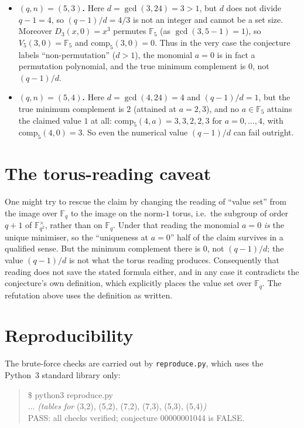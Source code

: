 \documentclass[11pt]{article}
\theoremstyle{definition}
\theoremstyle{remark}
\newcommand{\F}{\mathbb{F}}
\begin{document}
\begin{itemize}
\item \textbf{$(q,n) = (5,3)$.} Here $d = \gcd(3,24) = 3 > 1$, but $d$ does
  not divide $q-1 = 4$, so $(q-1)/d = 4/3$ is not an integer and cannot be a
  set size. Moreover $D_3(x,0) = x^3$ permutes $\F_5$ (as
  $\gcd(3, 5-1) = 1$), so $V_5(3,0) = \F_5$ and $\mathrm{comp}_5(3,0) = 0$.
  Thus in the very case the conjecture labels ``non-permutation''
  ($d>1$), the monomial $a=0$ is in fact a permutation polynomial, and the true
  minimum complement is $0$, not $(q-1)/d$.
\item \textbf{$(q,n) = (5,4)$.} Here $d = \gcd(4,24) = 4$ and
  $(q-1)/d = 1$, but the true minimum complement is $2$ (attained at $a=2,3$),
  and no $a \in \F_5$ attains the claimed value $1$ at all:
  $\mathrm{comp}_5(4,a) = 3,3,2,2,3$ for $a=0,\dots,4$, with
  $\mathrm{comp}_5(4,0) = 3$. So even the numerical value $(q-1)/d$ can fail
  outright.
\end{itemize}

\section{The torus-reading caveat}

One might try to rescue the claim by changing the reading of ``value set''
from the image over $\F_q$ to the image on the norm-$1$ torus, i.e.\ the
subgroup of order $q+1$ of $\F_{q^2}^{\times}$, rather than on $\F_q$. Under
that reading the monomial $a=0$ \emph{is} the unique minimiser, so the
``uniqueness at $a=0$'' half of the claim survives in a qualified sense. But
the minimum complement there is $0$, not $(q-1)/d$; the value $(q-1)/d$ is not
what the torus reading produces. Consequently that reading does not save the
stated formula either, and in any case it contradicts the conjecture's own
definition, which explicitly places the value set over $\F_q$. The refutation
above uses the definition as written.

\section{Reproducibility}

The brute-force checks are carried out by \texttt{reproduce.py}, which uses the
Python~3 standard library only:

\begin{quote}\ttfamily
\$ python3 reproduce.py\\
... \textit{(tables for } (3,2), (5,2), (7,2), (7,3), (5,3), (5,4)\textit{)}\\
PASS: all checks verified; conjecture 00000001044 is FALSE.
\end{quote}
\end{document}
